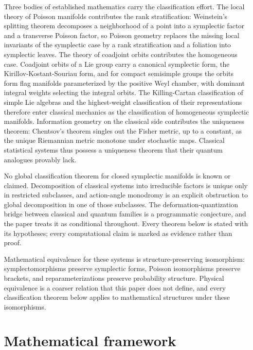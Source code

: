 \documentclass[11pt,letterpaper]{article}
\theoremstyle{definition}
\theoremstyle{remark}
\begin{document}
Three bodies of established mathematics carry the classification effort. The local theory of Poisson manifolds contributes the rank stratification: Weinstein's splitting theorem decomposes a neighborhood of a point into a symplectic factor and a transverse Poisson factor, so Poisson geometry replaces the missing local invariants of the symplectic case by a rank stratification and a foliation into symplectic leaves. The theory of coadjoint orbits contributes the homogeneous case. Coadjoint orbits of a Lie group carry a canonical symplectic form, the Kirillov-Kostant-Souriau form, and for compact semisimple groups the orbits form flag manifolds parameterized by the positive Weyl chamber, with dominant integral weights selecting the integral orbits. The Killing-Cartan classification of simple Lie algebras and the highest-weight classification of their representations therefore enter classical mechanics as the classification of homogeneous symplectic manifolds. Information geometry on the classical side contributes the uniqueness theorem: Chentsov's theorem singles out the Fisher metric, up to a constant, as the unique Riemannian metric monotone under stochastic maps. Classical statistical systems thus possess a uniqueness theorem that their quantum analogues provably lack.

No global classification theorem for closed symplectic manifolds is known or claimed. Decomposition of classical systems into irreducible factors is unique only in restricted subclasses, and action-angle monodromy is an explicit obstruction to global decomposition in one of those subclasses. The deformation-quantization bridge between classical and quantum families is a programmatic conjecture, and the paper treats it as conditional throughout. Every theorem below is stated with its hypotheses; every computational claim is marked as evidence rather than proof.

Mathematical equivalence for these systems is structure-preserving isomorphism: symplectomorphisms preserve symplectic forms, Poisson isomorphisms preserve brackets, and reparameterizations preserve probability structure. Physical equivalence is a coarser relation that this paper does not define, and every classification theorem below applies to mathematical structures under these isomorphisms.

\section{Mathematical framework}
\end{document}
